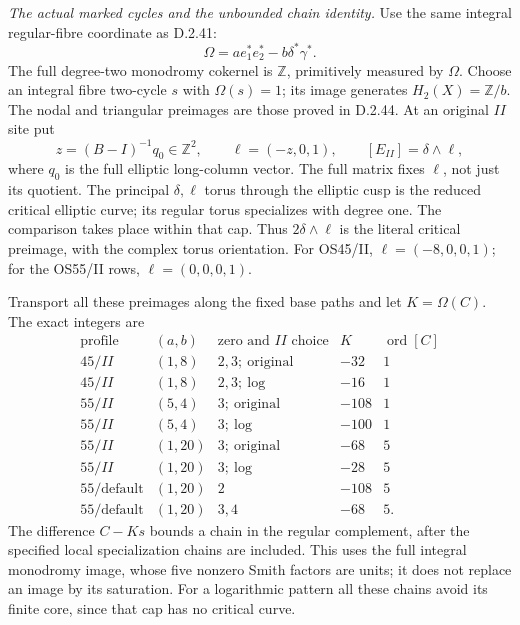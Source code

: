 \emph{The actual marked cycles and the unbounded chain identity.}
Use the same integral regular-fibre coordinate as D.2.41:
\[
                \Omega=a e_1^*e_2^*-b\delta^*\gamma^*.
                                                               \tag{D45.16}
\]
The full degree-two monodromy cokernel is $\mathbb Z$,
primitively measured by $\Omega$. Choose an integral
fibre two-cycle $s$ with $\Omega(s)=1$; its image generates
$H_2(X)=\mathbb Z/b$. The nodal and triangular preimages
are those proved in D.2.44. At an original $II$ site put
\[
 z=(B-I)^{-1}q_0\in\mathbb Z^2,\qquad
 \ell=(-z,0,1),\qquad [E_{II}]=\delta\wedge\ell,             \tag{D45.17}
\]
where $q_0$ is the full elliptic long-column vector.
The full matrix fixes $\ell$, not just its quotient.
The principal $\delta,\ell$ torus through the elliptic
cusp is the reduced critical elliptic curve; its regular
torus specializes with degree one. The comparison takes
place within that cap. Thus $2\delta\wedge\ell$ is the
literal critical preimage, with the complex torus orientation.
For OS45/II, $\ell=(-8,0,0,1)$; for the OS55/II rows,
$\ell=(0,0,0,1)$.

Transport all these preimages along the fixed base paths
and let $K=\Omega(C)$. The exact integers are
\[
\begin{array}{c|c|c|r|c}
 \text{profile}&(a,b)&\text{zero and }II\text{ choice}&K&
                                  \operatorname{ord}[C]\\\hline
 45/II&(1,8)&2,3;\ \mathrm{original}&-32&1\\
 45/II&(1,8)&2,3;\ \mathrm{log}&-16&1\\
 55/II&(5,4)&3;\ \mathrm{original}&-108&1\\
 55/II&(5,4)&3;\ \mathrm{log}&-100&1\\
 55/II&(1,20)&3;\ \mathrm{original}&-68&5\\
 55/II&(1,20)&3;\ \mathrm{log}&-28&5\\
 55/\mathrm{default}&(1,20)&2&-108&5\\
 55/\mathrm{default}&(1,20)&3,4&-68&5.
\end{array}                                                    \tag{D45.18}
\]
The difference $C-Ks$ bounds a chain in the regular
complement, after the specified local specialization
chains are included. This uses the full integral
monodromy image, whose five nonzero Smith factors are
units; it does not replace an image by its saturation.
For a logarithmic pattern all these chains avoid its
finite core, since that cap has no critical curve.

